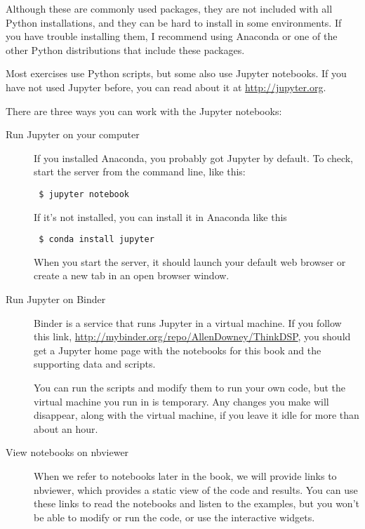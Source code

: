 \documentclass[12pt]{book} \usepackage[width=5.5in,height=8.5in, hmarginratio=3:2,vmarginratio=1:1]{geometry}
\begin{document}
Although these are commonly used packages, they are not included with all Python installations, and they can be hard to install in some environments. If you have trouble installing them, I recommend using Anaconda or one of the other Python distributions that include these packages.  

Most exercises use Python scripts, but some also use Jupyter notebooks. If you have not used Jupyter before, you can read about it at \url{http://jupyter.org}.  

There are three ways you can work with the Jupyter notebooks: 

\begin{description} 

\item[Run Jupyter on your computer] 

If you installed Anaconda, you probably got Jupyter by default. To check, start the server from the command line, like this: 

\begin{verbatim} $ jupyter notebook \end{verbatim} 

If it's not installed, you can install it in Anaconda like this 

\begin{verbatim} $ conda install jupyter \end{verbatim} 

When you start the server, it should launch your default web browser or create a new tab in an open browser window. 

\item[Run Jupyter on Binder] 

Binder is a service that runs Jupyter in a virtual machine. If you follow this link, \url{http://mybinder.org/repo/AllenDowney/ThinkDSP}, you should get a Jupyter home page with the notebooks for this book and the supporting data and scripts. 

You can run the scripts and modify them to run your own code, but the virtual machine you run in is temporary. Any changes you make will disappear, along with the virtual machine, if you leave it idle for more than about an hour. 

\item[View notebooks on nbviewer] 

When we refer to notebooks later in the book, we will provide links to nbviewer, which provides a static view of the code and results. You can use these links to read the notebooks and listen to the examples, but you won't be able to modify or run the code, or use the interactive widgets. 

\end{description} 
\end{document}
